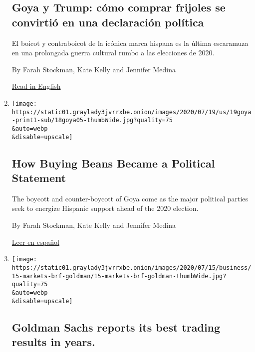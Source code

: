\begin{enumerate}
  \hypertarget{goya-y-trump-cuxf3mo-comprar-frijoles-se-convirtiuxf3-en-una-declaraciuxf3n-poluxedtica}{%
  \subsection{Goya y Trump: cómo comprar frijoles se convirtió en una
  declaración
  política}\label{goya-y-trump-cuxf3mo-comprar-frijoles-se-convirtiuxf3-en-una-declaraciuxf3n-poluxedtica}}

  El boicot y contraboicot de la icónica marca hispana es la última
  escaramuza en una prolongada guerra cultural rumbo a las elecciones de
  2020.

  By Farah Stockman, Kate Kelly and Jennifer Medina

  \href{https://www.nytimes3xbfgragh.onion/2020/07/19/us/goya-trump-hispanic-vote.html}{Read
  in English}
\item
  \href{/2020/07/19/us/goya-trump-hispanic-vote.html}{}

  \texttt{[image: https://static01.graylady3jvrrxbe.onion/images/2020/07/19/us/19goya-print1-sub/18goya05-thumbWide.jpg?quality=75\\\&auto=webp\\\&disable=upscale]}

  \hypertarget{how-buying-beans-became-a-political-statement}{%
  \subsection{How Buying Beans Became a Political
  Statement}\label{how-buying-beans-became-a-political-statement}}

  The boycott and counter-boycott of Goya come as the major political
  parties seek to energize Hispanic support ahead of the 2020 election.

  By Farah Stockman, Kate Kelly and Jennifer Medina

  \href{https://www.nytimes3xbfgragh.onion/es/2020/07/19/espanol/goya-boicot-trump.html}{Leer
  en español}
\item
  \href{/live/2020/07/15/business/stock-market-today-coronavirus/goldman-sachs-reports-its-best-trading-results-in-years}{}

  \texttt{[image: https://static01.graylady3jvrrxbe.onion/images/2020/07/15/business/15-markets-brf-goldman/15-markets-brf-goldman-thumbWide.jpg?quality=75\\\&auto=webp\\\&disable=upscale]}

  \hypertarget{goldman-sachs-reports-its-best-trading-results-in-years}{%
  \subsection{Goldman Sachs reports its best trading results in
  years.}\label{goldman-sachs-reports-its-best-trading-results-in-years}}


\end{enumerate}
